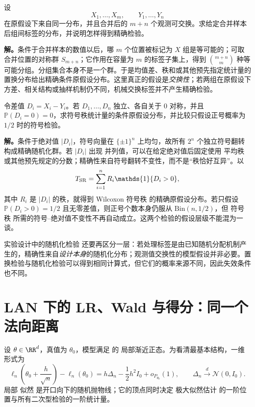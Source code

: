 \begin{workedexample}[两样本置换与交换性]
设
\[
 X_1,\ldots,X_m,
 \qquad
 Y_1,\ldots,Y_n
\]
在原假设下来自同一分布，并且合并后的 $m+n$ 个观测可交换。求给定合并样本后组间标签的分布，并说明怎样得到精确检验。

\textbf{解。}条件于合并样本的数值以后，哪 $m$ 个位置被标记为 $X$ 组是等可能的；可取合并位置的对称群 $S_{m+n}$；它作用在容量为 $m$ 的标签子集上，得到 $\binom{m+n}{m}$ 种等可能分组。分组集合本身不是一个群。于是均值差、秩和或其他预先指定统计量的置换分布给出精确条件原假设分布。这里真正的假设是\emph{交换性}；若两组在原假设下方差、相关结构或抽样机制仍不同，机械交换标签并不产生精确检验。
\end{workedexample}

\begin{workedexample}[符号检验与符号秩检验]
令差值 $D_i=X_i-Y_i$。若 $D_1,\ldots,D_n$ 独立、各自关于 $0$ 对称，并且 $\mathbb P(D_i=0)=0$，求符号秩统计量的条件原假设分布，并比较只假设正号概率为 $1/2$ 时的符号检验。

\textbf{解。}条件于绝对值 $|D_i|$，符号向量在 $\{\pm1\}^n$ 上均匀，故所有 $2^n$ 个独立符号翻转构成精确随机化群。若 $|D_i|$ 出现 并列值，可以在给定绝对值后固定使用 平均秩 或其他预先规定的分数；精确性来自符号翻转不变性，而不是“秩恰好互异”。以
\[
 T_{\rm SR}
 =\sum_{i=1}^n R_i\mathds{1}\{D_i>0\},
\]
其中 $R_i$ 是 $|D_i|$ 的秩，就得到 Wilcoxon 符号秩 的精确原假设分布。若只假设 $\mathbb P(D_i>0)=1/2$ 且无零差值，则正号个数本身仍服从 $\mathrm{Bin}(n,1/2)$，但 符号秩 所需的符号--绝对值不变性不再自动成立。这两个检验的假设层级不能混为一谈。
\end{workedexample}

实验设计中的随机化检验 还要再区分一层：若处理标签是由已知随机分配机制产生的，精确性来自\emph{设计本身}的随机化分布；观测值交换性的模型假设并非必要。置换检验与随机化检验可以得到相同计算式，但它们的概率来源不同，因此失效条件也不同。

\section{LAN 下的 LR、Wald 与得分：同一个法向距离}

\begin{definition}[局部二次似然实验]
设 $\theta\in\RR^d$，真值为 $\theta_0$，模型满足  的 局部渐近正态。为看清最基本结构，一维形式为
\begin{equation*}\ell_n\!\left(\theta_0+\frac h{\sqrt n}\right)-\ell_n(\theta_0)
 =h\Delta_n-\frac12h^2I_0+o_{P_{\theta_0}}(1),
 \qquad
 \Delta_n\xrightarrow{d}\mathcal N(0,I_0).
\end{equation*}
局部 似然 是开口向下的随机抛物线；它的顶点同时决定 极大似然估计 的一阶位置与所有二次型检验的一阶统计量。
\end{definition}

